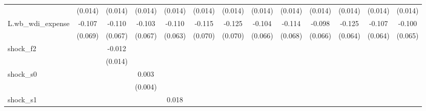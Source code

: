 {\begin{tabular}{l*{12}{c}}
            &     (0.014)         &     (0.014)         &     (0.014)         &     (0.014)         &     (0.014)         &     (0.014)         &     (0.014)         &     (0.014)         &     (0.014)         &     (0.014)         &     (0.014)         &     (0.014)         \\
\addlinespace
L.wb\_wdi\_expense&      -0.107         &      -0.110         &      -0.103         &      -0.110\sym{*}  &      -0.115         &      -0.125\sym{*}  &      -0.104         &      -0.114         &      -0.098         &      -0.125\sym{*}  &      -0.107         &      -0.100         \\
            &     (0.069)         &     (0.067)         &     (0.067)         &     (0.063)         &     (0.070)         &     (0.070)         &     (0.066)         &     (0.068)         &     (0.066)         &     (0.064)         &     (0.064)         &     (0.065)         \\
\addlinespace
shock\_f2    &                     &      -0.012         &                     &                     &                     &                     &                     &                     &                     &                     &                     &                     \\
            &                     &     (0.014)         &                     &                     &                     &                     &                     &                     &                     &                     &                     &                     \\
\addlinespace
shock\_s0    &                     &                     &       0.003         &                     &                     &                     &                     &                     &                     &                     &                     &                     \\
            &                     &                     &     (0.004)         &                     &                     &                     &                     &                     &                     &                     &                     &                     \\
\addlinespace
shock\_s1    &                     &                     &                     &       0.018\sym{**} &                     &                     &                     &                     &                     &                     &                     &                     \\

\end{tabular}}

